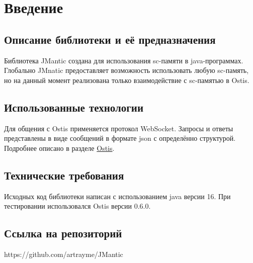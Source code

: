 \section{Введение}
\subsection{Описание библиотеки и её предназначения}
Библиотека JMantic создана для использования sc-памяти в java-программах. Глобально JMnatic предоставляет возможность использовать любую sc-память, но на данный момент реализована только взаимодействие с sc-памятью в Ostis.  
\subsection{Использованные технологии}
Для общения с Ostis применяется протокол WebSocket. Запросы и ответы представлены в виде сообщений в формате json с определённо структурой. Подробнее описано в разделе \hyperref[sec:ostis]{Ostis}.
\subsection{Технические требования}
Исходных код библиотеки написан с использованием java версии 16. При тестировании использовался Ostis версии 0.6.0.  
\subsection{Ссылка на репозиторий}
https://github.com/artrayme/JMantic